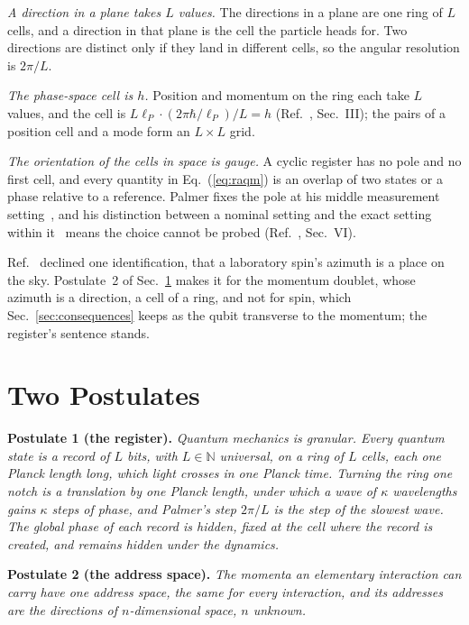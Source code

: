 \documentclass[aps,prd,twocolumn,superscriptaddress,nofootinbib]{revtex4-2}
\begin{document}
\textit{A direction in a plane takes $L$ values.} The directions in a plane are one ring of $L$ cells, and a direction in that plane is the cell the particle heads for. Two directions are distinct only if they land in different cells, so the angular resolution is $2\pi/L$.

\textit{The phase-space cell is $h$.} Position and momentum on the ring each take $L$ values, and the cell is $L\ell_P\cdot(2\pi\hbar/\ell_P)/L = h$ (Ref.~\cite{korytko2026c}, Sec.~III); the pairs of a position cell and a mode form an $L\times L$ grid.

\textit{The orientation of the cells in space is gauge.} A cyclic register has no pole and no first cell, and every quantity in Eq.~(\ref{eq:raqm}) is an overlap of two states or a phase relative to a reference. Palmer fixes the pole at his middle measurement setting~\cite{palmer2026c}, and his distinction between a nominal setting and the exact setting within it~\cite{palmer2024} means the choice cannot be probed (Ref.~\cite{korytko2026c}, Sec.~VI).

Ref.~\cite{korytko2026c} declined one identification, that a laboratory spin's azimuth is a place on the sky. Postulate~2 of Sec.~\ref{sec:postulates} makes it for the momentum doublet, whose azimuth is a direction, a cell of a ring, and not for spin, which Sec.~\ref{sec:consequences} keeps as the qubit transverse to the momentum; the register's sentence stands.

\section{Two Postulates}
\label{sec:postulates}

\textbf{Postulate 1 (the register).} \emph{Quantum mechanics is granular. Every quantum state is a record of $L$ bits, with $L\in\mathbb{N}$ universal, on a ring of $L$ cells, each one Planck length long, which light crosses in one Planck time. Turning the ring one notch is a translation by one Planck length, under which a wave of $\kappa$ wavelengths gains $\kappa$ steps of phase, and Palmer's step $2\pi/L$ is the step of the slowest wave. The global phase of each record is hidden, fixed at the cell where the record is created, and remains hidden under the dynamics.}

\textbf{Postulate 2 (the address space).} \emph{The momenta an elementary interaction can carry have one address space, the same for every interaction, and its addresses are the directions of $n$-dimensional space, $n$ unknown.}
\end{document}
